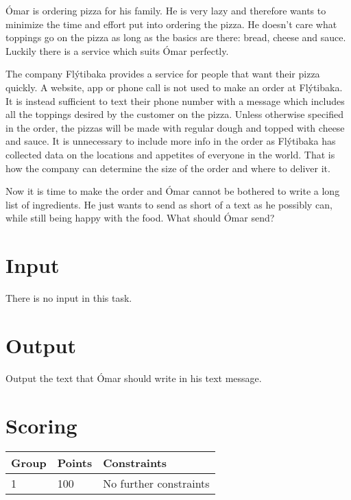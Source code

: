 
Ómar is ordering pizza for his family.
He is very lazy and therefore wants to minimize the time and effort put into ordering the pizza.
He doesn't care what toppings go on the pizza as long as the basics are there: bread, cheese and sauce.
Luckily there is a service which suits Ómar perfectly.

The company Flýtibaka provides a service for people that want their pizza quickly.
A website, app or phone call is not used to make an order at Flýtibaka.
It is instead sufficient to text their phone number with a message which includes all the toppings desired by the customer on the pizza.
Unless otherwise specified in the order, the pizzas will be made with regular dough and topped with cheese and sauce.
It is unnecessary to include more info in the order as Flýtibaka has collected data on the locations and appetites of everyone in the world.
That is how the company can determine the size of the order and where to deliver it.

Now it is time to make the order and Ómar cannot be bothered to write a long list of ingredients.
He just wants to send as short of a text as he possibly can, while still being happy with the food.
What should Ómar send?

\section*{Input}
There is no input in this task.

\section*{Output}
Output the text that Ómar should write in his text message.

\section*{Scoring}
\begin{tabular}{|l|l|l|}
\hline
Group & Points & Constraints \\ \hline
1     & 100    & No further constraints\\ \hline
\end{tabular}

